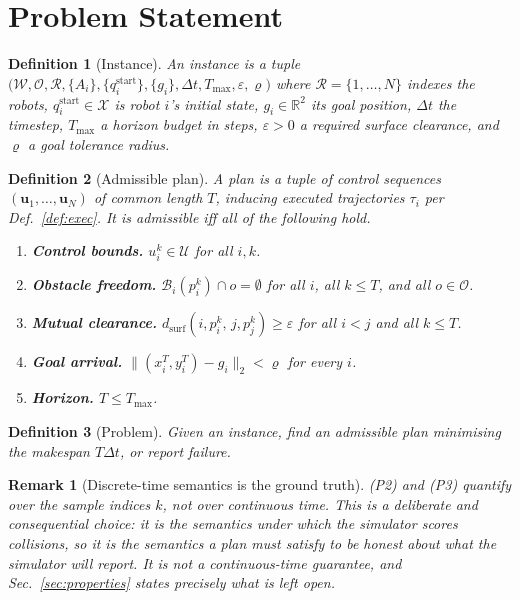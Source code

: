 \documentclass[conference]{IEEEtran}
\newtheorem{definition}{Definition}
\newtheorem{remark}{Remark}
\newcommand{\R}{\mathbb{R}}
\newcommand{\W}{\mathcal{W}}
\newcommand{\Obs}{\mathcal{O}}
\newcommand{\Rob}{\mathcal{R}}
\newcommand{\Bod}{\mathcal{B}}
\newcommand{\X}{\mathcal{X}}
\newcommand{\Uc}{\mathcal{U}}
\newcommand{\clr}{\varepsilon}
\begin{document}
\section{Problem Statement}
\label{sec:problem}

\begin{definition}[Instance]
\label{def:instance}
An instance is a tuple
$\big(\W, \Obs, \Rob, \{A_i\}, \{q_i^{\text{start}}\}, \{g_i\}, \Delta t, T_{\max},
\clr, \varrho\big)$
where $\Rob = \{1,\dots,N\}$ indexes the robots, $q_i^{\text{start}} \in \X$ is robot $i$'s
initial state, $g_i \in \R^2$ its goal position, $\Delta t$ the timestep, $T_{\max}$ a
horizon budget in steps, $\clr > 0$ a required surface clearance, and $\varrho$ a goal
tolerance radius.
\end{definition}

\begin{definition}[Admissible plan]
\label{def:plan}
A \emph{plan} is a tuple of control sequences $(\mathbf{u}_1,\dots,\mathbf{u}_N)$ of common
length $T$, inducing executed trajectories $\tau_i$ per Def.~\ref{def:exec}. It is
\emph{admissible} iff all of the following hold.
\begin{enumerate}
  \item[(P1)] \textbf{Control bounds.} $u_i^k \in \Uc$ for all $i,k$.
  \item[(P2)] \textbf{Obstacle freedom.} $\Bod_i(p_i^k) \cap o = \emptyset$ for all
        $i$, all $k \le T$, and all $o \in \Obs$.
  \item[(P3)] \textbf{Mutual clearance.}
        $d_{\text{surf}}(i,p_i^k,\,j,p_j^k) \ge \clr$ for all $i < j$ and all $k \le T$.
  \item[(P4)] \textbf{Goal arrival.}
        $\lVert (x_i^T,y_i^T) - g_i \rVert_2 < \varrho$ for every $i$.
  \item[(P5)] \textbf{Horizon.} $T \le T_{\max}$.
\end{enumerate}
\end{definition}

\begin{definition}[Problem]
\label{def:problem}
Given an instance, find an admissible plan minimising the \emph{makespan} $T\Delta t$, or
report failure.
\end{definition}

\begin{remark}[Discrete-time semantics is the ground truth]
(P2) and (P3) quantify over the sample indices $k$, not over continuous time. This is a
deliberate and consequential choice: it is the semantics under which the simulator scores
collisions, so it is the semantics a plan must satisfy to be honest about what the
simulator will report. It is \emph{not} a continuous-time guarantee, and
Sec.~\ref{sec:properties} states precisely what is left open.
\end{remark}
\end{document}
